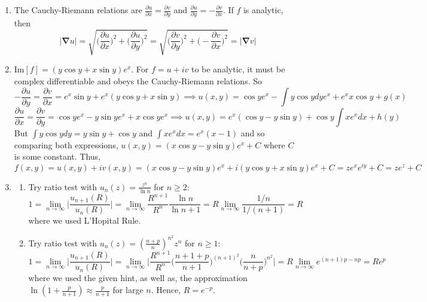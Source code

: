 \documentclass[a4paper]{article}
\begin{document}
\begin{ans}\leavevmode
\begin{enumerate}[label=(\alph*)]
\item The Cauchy-Riemann relations are $\frac{\partial u}{\partial x}=\frac{\partial v}{\partial y}$ and $\frac{\partial u}{\partial y}=-\frac{\partial v}{\partial x}$. If $f$ is analytic, then
$$|\boldsymbol{\nabla}u|=\sqrt{\bigg(\frac{\partial u}{\partial x}\bigg)^2+\bigg(\frac{\partial u}{\partial y}\bigg)^2}=\sqrt{\bigg(\frac{\partial v}{\partial y}\bigg)^2+\bigg(-\frac{\partial v}{\partial x}\bigg)^2}=|\boldsymbol{\nabla}v|$$
\item  $\text{Im}[f]=(y\cos y+x\sin y)e^x$. For $f=u+iv$ to be analytic, it must be complex differentiable and obeys the Cauchy-Riemann relations. So
$$-\frac{\partial u}{\partial y}=\frac{\partial v}{\partial x}=e^x\sin y+e^x(y\cos y+x\sin y)\implies u(x,y)=\cos ye^x-\int y\cos ydy e^x+e^x x\cos y+g(x)$$
$$\frac{\partial u}{\partial x}=\frac{\partial v}{\partial y}=\cos y e^x-y\sin y e^x+x\cos ye^x\implies u(x,y)=e^x(\cos y-y\sin y)+\cos y\int xe^xdx+h(y)$$
But $\int y\cos ydy=y\sin y+\cos y$ and $\int xe^xdx=e^x(x-1)$ and so comparing both expressions, $u(x,y)=(x\cos y-y\sin y)e^x+C$ where $C$ is some constant. Thus,
$$f(x,y)=u(x,y)+iv(x,y)=(x\cos y-y\sin y)e^x+i(y\cos y+x\sin y)e^x+C=ze^xe^{iy}+C=ze^z+C$$
\item 
\begin{enumerate}[label=(\roman*)]
\item Try ratio test with $u_n(z)=\frac{z^n}{\ln n}$ for $n\geq 2$:
$$1=\lim_{n\rightarrow\infty}\bigg|\frac{u_{n+1}(R)}{u_n(R)}\bigg|=\lim_{n\rightarrow\infty}\frac{R^{n+1}}{R^n}\frac{\ln n}{\ln n+1}=R\lim_{n\rightarrow\infty}\frac{1/n}{1/(n+1)}=R$$
where we used L'Hopital Rule.
\item Try ratio test with $u_n(z)=(\frac{n+p}{n})^{n^2}z^n$ for $n\geq 1$:
$$1=\lim_{n\rightarrow\infty}\bigg|\frac{u_{n+1}(R)}{u_n(R)}\bigg|=\lim_{n\rightarrow\infty}\bigg|\frac{R^{n+1}}{R^n}\bigg(\frac{n+1+p}{n+1}\bigg)^{(n+1)^2}\bigg(\frac{n}{n+p}\bigg)^{n^2}\bigg|=R\lim_{n\rightarrow\infty}e^{(n+1)p-np}=Re^p$$
where we used the given hint, as well as, the approximation $\ln(1+\frac{p}{n+1})\approx\frac{p}{n+1}$ for large $n$. Hence, $R=e^{-p}$.
\end{enumerate}
\end{enumerate}
\end{ans}
\newpage
\end{document}
